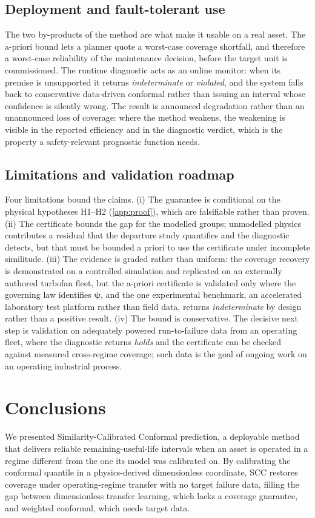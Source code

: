 \documentclass[review,times]{elsarticle}
\theoremstyle{definition}
\theoremstyle{remark}
\begin{document}
\subsection{Deployment and fault-tolerant use}\label{sec:disc-deploy}
The two by-products of the method are what make it usable on a real asset. The a-priori bound lets a
planner quote a worst-case coverage shortfall, and therefore a worst-case reliability of the
maintenance decision, before the target unit is commissioned. The runtime diagnostic acts as an
online monitor: when its premise is unsupported it returns \emph{indeterminate} or \emph{violated},
and the system falls back to conservative data-driven conformal rather than issuing an interval whose
confidence is silently wrong. The result is announced degradation rather than an unannounced loss
of coverage: where the method weakens, the weakening is visible in the reported efficiency and in
the diagnostic verdict, which is the property a safety-relevant prognostic function needs.

\subsection{Limitations and validation roadmap}\label{sec:disc-limits}
Four limitations bound the claims. (i) The guarantee is conditional on the physical hypotheses
H1--H2 (\ref{app:proof}), which are falsifiable rather than proven. (ii) The certificate bounds the
gap for the modelled groups; unmodelled physics contributes a residual that the departure study
quantifies and the diagnostic detects, but that must be bounded a priori to use the certificate under
incomplete similitude. (iii) The evidence is graded rather than uniform: the coverage recovery is
demonstrated on a controlled simulation and replicated on an externally authored turbofan fleet,
but the a-priori certificate is validated only where the governing law identifies
$\boldsymbol\psi$, and the one experimental benchmark, an accelerated laboratory test platform
rather than field data, returns \emph{indeterminate} by design rather than a positive result.
(iv) The bound is conservative.
The decisive next step is validation on adequately powered run-to-failure data from an operating
fleet, where the diagnostic returns \emph{holds} and the certificate can be checked against
measured cross-regime coverage; such data is the goal of ongoing work on an operating industrial
process.
\section{Conclusions}\label{sec:conclusions}
We presented Similarity-Calibrated Conformal prediction, a deployable method that delivers reliable
remaining-useful-life intervals when an asset is operated in a regime different from the one its model
was calibrated on. By calibrating the conformal quantile in a physics-derived dimensionless
coordinate, SCC restores coverage under operating-regime transfer with no target failure data,
filling the gap between dimensionless transfer learning, which lacks a coverage guarantee, and
weighted conformal, which needs target data.
\end{document}
